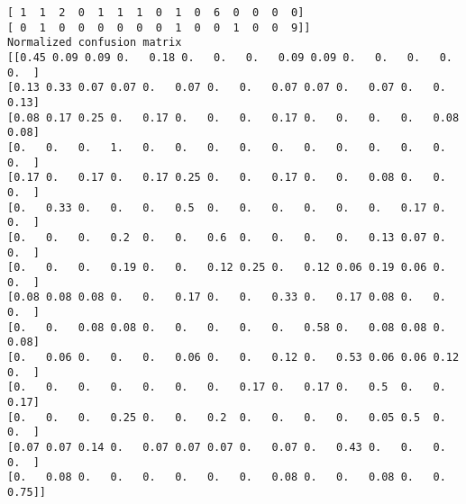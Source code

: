 \documentclass[]{article}
\begin{document}
\begin{verbatim}
[ 1  1  2  0  1  1  1  0  1  0  6  0  0  0  0]
[ 0  1  0  0  0  0  0  0  1  0  0  1  0  0  9]]
Normalized confusion matrix
[[0.45 0.09 0.09 0.   0.18 0.   0.   0.   0.09 0.09 0.   0.   0.   0.
0.  ]
[0.13 0.33 0.07 0.07 0.   0.07 0.   0.   0.07 0.07 0.   0.07 0.   0.
0.13]
[0.08 0.17 0.25 0.   0.17 0.   0.   0.   0.17 0.   0.   0.   0.   0.08
0.08]
[0.   0.   0.   1.   0.   0.   0.   0.   0.   0.   0.   0.   0.   0.
0.  ]
[0.17 0.   0.17 0.   0.17 0.25 0.   0.   0.17 0.   0.   0.08 0.   0.
0.  ]
[0.   0.33 0.   0.   0.   0.5  0.   0.   0.   0.   0.   0.   0.17 0.
0.  ]
[0.   0.   0.   0.2  0.   0.   0.6  0.   0.   0.   0.   0.13 0.07 0.
0.  ]
[0.   0.   0.   0.19 0.   0.   0.12 0.25 0.   0.12 0.06 0.19 0.06 0.
0.  ]
[0.08 0.08 0.08 0.   0.   0.17 0.   0.   0.33 0.   0.17 0.08 0.   0.
0.  ]
[0.   0.   0.08 0.08 0.   0.   0.   0.   0.   0.58 0.   0.08 0.08 0.
0.08]
[0.   0.06 0.   0.   0.   0.06 0.   0.   0.12 0.   0.53 0.06 0.06 0.12
0.  ]
[0.   0.   0.   0.   0.   0.   0.   0.17 0.   0.17 0.   0.5  0.   0.
0.17]
[0.   0.   0.   0.25 0.   0.   0.2  0.   0.   0.   0.   0.05 0.5  0.
0.  ]
[0.07 0.07 0.14 0.   0.07 0.07 0.07 0.   0.07 0.   0.43 0.   0.   0.
0.  ]
[0.   0.08 0.   0.   0.   0.   0.   0.   0.08 0.   0.   0.08 0.   0.
0.75]]
\end{verbatim}
\end{document}
